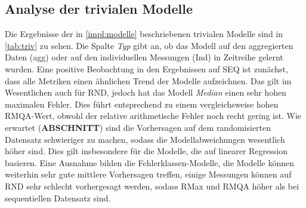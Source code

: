 \documentclass[
	12pt,
	a4paper,
	BCOR10mm,
	DIV14,
	listof=totoc,
	bibliography=totoc,
	headsepline
]{scrreprt}
\begin{document}
\subsection{Analyse der trivialen Modelle}

Die Ergebnisse der in \ref{impl:modelle} beschriebenen trivialen Modelle sind in \ref{tab:triv} zu sehen. Die Spalte \textit{Typ} gibt an, ob das Modell auf den aggregierten Daten (agg) oder auf den individuellen Messungen (Ind) in Zeitreihe gelernt wurden.
Eine positive Beobachtung in den Ergebnissen auf SEQ ist zunächst, dass alle Metriken einen ähnlichen Trend der  Modelle aufzeichnen.
Das gilt im Wesentlichen auch für RND, jedoch hat das Modell \textit{Median} einen sehr hohen maximalen Fehler. Dies führt entsprechend zu einem vergleichsweise hohen RMQA-Wert, obwohl der relative arithmetische Fehler noch recht gering ist.
Wie erwartet (\textbf{ABSCHNITT}) sind die Vorhersagen auf dem randomisierten Datensatz schwieriger zu machen, sodass die Modellabweichungen wesentlich höher sind.
Dies gilt insbesondere für die Modelle, die auf linearer Regression basieren.
Eine Ausnahme bilden die Fehlerklassen-Modelle, die Modelle können weiterhin sehr gute mittlere Vorhersagen treffen, einige Messungen können auf RND sehr schlecht vorhergesagt werden, sodass RMax und RMQA höher als bei sequentiellen Datensatz sind.
\end{document}
